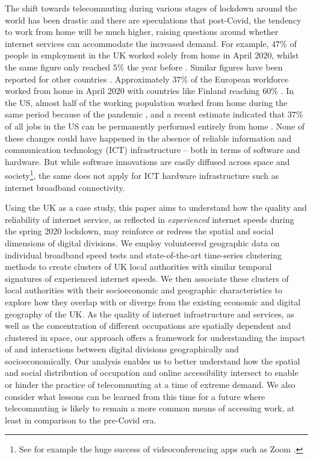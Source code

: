 \documentclass[]{interact}
\theoremstyle{plain}%
\theoremstyle{definition}
\theoremstyle{remark}
\begin{document}
The shift towards telecommuting during various stages of lockdown around
the world has been drastic and there are speculations that post-Covid,
the tendency to work from home will be much higher, raising questions
around whether internet services can accommodate the increased demand.
For example, \(47\)\% of people in employment in the UK worked solely
from home in April \(2020\), whilst the same figure only reached \(5\)\%
the year before \citep{ons2020, ons2020lm2019}. Similar figures have
been reported for other countries \citep{felstead2020homeworking}.
Approximately \(37\)\% of the European workforce worked from home in
April \(2020\) with countries like Finland reaching \(60\)\%
\citep{eurofound2020}. In the US, almost half of the working population
worked from home during the same period because of the pandemic
\citep{brynjolfsson2020covid}, and a recent estimate indicated that
\(37\)\% of all jobs in the US can be permanently performed entirely
from home \citep{NBERw26948}. None of these changes could have happened
in the absence of reliable information and communication technology
(ICT) infrastructure -- both in terms of software and hardware. But
while software innovations are easily diffused across space and
society\footnote{See for example the huge success of videoconferencing
  apps such as Zoom \citep{marks2020zoom}.}, the same does not apply for
ICT hardware infrastructure such as internet broadband connectivity.

Using the UK as a case study, this paper aims to understand how the
quality and reliability of internet service, as reflected in
\emph{experienced} internet speeds during the spring 2020 lockdown, may
reinforce or redress the spatial and social dimensions of digital
divisions. We employ volunteered geographic data on individual broadband
speed tests and state-of-the-art time-series clustering methods to
create clusters of UK local authorities with similar temporal signatures
of experienced internet speeds. We then associate these clusters of
local authorities with their socioeconomic and geographic
characteristics to explore how they overlap with or diverge from the
existing economic and digital geography of the UK. As the quality of
internet infrastructure and services, as well as the concentration of
different occupations are spatially dependent and clustered in space,
our approach offers a framework for understanding the impact of and
interactions between digital divisions geographically and
socioeconomically. Our analysis enables us to better understand how the
spatial and social distribution of occupation and online accessibility
intersect to enable or hinder the practice of telecommuting at a time of
extreme demand. We also consider what lessons can be learned from this
time for a future where telecommuting is likely to remain a more common
means of accessing work, at least in comparison to the pre-Covid era.
\end{document}
